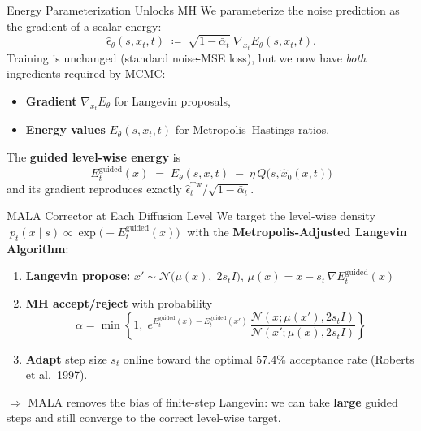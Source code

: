 \documentclass[final,hyperref={pdfpagelabels=false}]{beamer}
\newlength{\colwidth}
\begin{document}
\begin{frame}[t]
\begin{columns}[t]
\begin{column}{\colwidth}
\begin{block}{\Large Energy Parameterization Unlocks MH}
We parameterize the noise prediction as the gradient of a scalar energy:
\[
\hat\epsilon_\theta(s,x_t,t)\;\coloneqq\;\sqrt{1-\bar\alpha_t}\;\nabla_{x_t} E_\theta(s,x_t,t).
\]
Training is unchanged (standard noise-MSE loss), but we now have \emph{both}
ingredients required by MCMC:
\begin{itemize}
  \item \textbf{Gradient} $\nabla_{x_t} E_\theta$ for Langevin proposals,
  \item \textbf{Energy values} $E_\theta(s,x_t,t)$ for Metropolis--Hastings ratios.
\end{itemize}

\vspace{0.3em}
The \textbf{guided level-wise energy} is
\[
\boxed{\;E^{\mathrm{guided}}_t(x) \;=\; E_\theta(s,x,t)\;-\;\eta\,Q\!\bigl(s,\hat x_0(x,t)\bigr)\;}
\]
and its gradient reproduces exactly $\hat\epsilon^{\mathrm{Tw}}_t / \sqrt{1{-}\bar\alpha_t}$.
\end{block}

\vspace{0.6cm}

\begin{block}{\Large MALA Corrector at Each Diffusion Level}
We target the level-wise density
$\;p_t(x \mid s) \propto \exp\!\bigl(-E^{\mathrm{guided}}_t(x)\bigr)\;$
with the \textbf{Metropolis-Adjusted Langevin Algorithm}:
\begin{enumerate}
  \item \textbf{Langevin propose:}
        $x' \sim \mathcal{N}\!\bigl(\mu(x),\; 2 s_t I\bigr)$,\;
        $\mu(x)=x-s_t\,\nabla E^{\mathrm{guided}}_t(x)$
  \item \textbf{MH accept/reject} with probability
        \[
        \alpha = \min\!\left\{1,\;
        e^{E^{\mathrm{guided}}_t(x)-E^{\mathrm{guided}}_t(x')}\,
        \frac{\mathcal{N}(x;\mu(x'),2s_t I)}{\mathcal{N}(x';\mu(x),2s_t I)}\right\}
        \]
  \item \textbf{Adapt} step size $s_t$ online toward the optimal $57.4\%$
        acceptance rate (Roberts et al.\ 1997).
\end{enumerate}

\vspace{0.3em}
$\Rightarrow$ MALA removes the bias of finite-step Langevin: we can take
\textbf{large} guided steps and still converge to the correct level-wise target.
\end{block}


\end{column}
\end{columns}
\end{frame}
\end{document}
